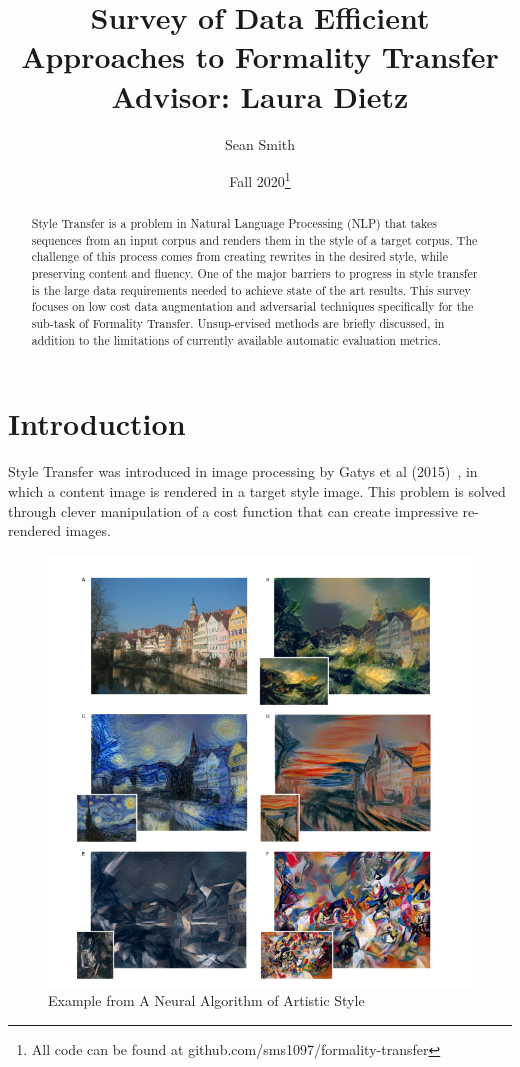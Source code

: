 \documentclass[12pt]{article}
\title{Survey of Data Efficient Approaches to Formality Transfer
\\ \large Advisor: Laura Dietz}
\author{Sean Smith}
\date{Fall 2020\footnote{All code can be found at github.com/sms1097/formality-transfer}}
\begin{document}
\maketitle

\begin{abstract}
    Style Transfer is a problem in Natural Language Processing (NLP) that takes sequences 
    from an input corpus and renders them in the style of a target corpus. The challenge
    of this process comes from creating rewrites in the desired style, while preserving
    content and fluency. One of the major barriers to progress in style transfer is the 
    large data requirements needed to achieve state of the art results. This survey focuses
    on low cost data augmentation and adversarial techniques specifically for the 
    sub-task of Formality Transfer. Unsup-ervised methods are briefly discussed, 
    in addition to the limitations of currently available automatic evaluation metrics. 
\end{abstract}

\section{Introduction}

Style Transfer was introduced in image processing by Gatys et al (2015)~\cite{pictransfer}, 
in which a
content image is rendered in a target style image.  This problem is solved through clever 
manipulation of a cost function that can create impressive re-rendered images. 
\begin{figure}
    \centering
    \includegraphics[scale=0.3]{house-painting.png}
    \caption{Example from A Neural Algorithm of Artistic Style}
\end{figure}
\end{document}
